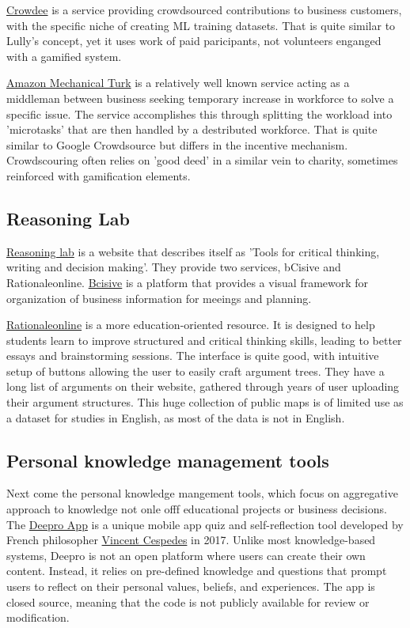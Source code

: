 \documentclass{report}
\begin{document}
\href{https://www.crowdee.com/}{Crowdee} is a service providing crowdsourced contributions to business customers, with the specific niche of creating ML training datasets. That is quite similar to Lully's concept, yet it uses work of paid paricipants, not volunteers enganged with a gamified system.

\href{https://www.mturk.com/}{Amazon Mechanical Turk} is a relatively well known service acting as a middleman between business seeking temporary increase in workforce to solve a specific issue.
The service accomplishes this through splitting the workload into 'microtasks' that are then handled by a destributed workforce. That is quite similar to Google Crowdsource but differs in the incentive mechanism. Crowdscouring often relies on 'good deed' in a similar vein to charity, sometimes reinforced with gamification elements.

\subsection{Reasoning Lab}
\href{https://www.reasoninglab.com/argument-mapping/}{Reasoning lab} is a website that describes itself as 'Tools for critical thinking, writing and decision making'. They provide two services, bCisive and Rationaleonline.
\href{https://www.reasoninglab.com/bcisive-2/}{Bcisive} is a platform that provides a visual framework for organization of business information for meeings and planning.

\href{https://www.rationaleonline.com/browse/all}{Rationaleonline} is a more education-oriented resource. It is designed to help students learn to improve structured and critical thinking skills, leading to better essays and brainstorming sessions.
The interface is quite good, with intuitive setup of buttons allowing the user to easily craft argument trees.
They have a long list of arguments on their website, gathered through years of user uploading their argument structures.
This huge collection of public maps is of limited use as a dataset for studies in English, as most of the data is not in English.

\subsection{Personal knowledge management tools}
Next come the personal knowledge mangement tools, which focus on aggregative approach to knowledge not onle offf educational projects or business decisions.
The \href{https://play.google.com/store/apps/details?id=fr.deepro.app&hl=en_US}{Deepro App} is a unique mobile app quiz and self-reflection tool developed by French philosopher \href{https://en.wikipedia.org/wiki/Vincent_Cespedes}{Vincent Cespedes} in 2017. Unlike most knowledge-based systems, Deepro is not an open platform where users can create their own content. Instead, it relies on pre-defined knowledge and questions that prompt users to reflect on their personal values, beliefs, and experiences. The app is closed source, meaning that the code is not publicly available for review or modification.
\end{document}
